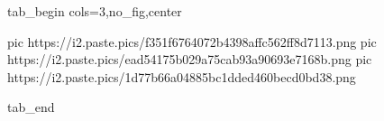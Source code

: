  
 
 
 
 


\ifcmt
  tab_begin cols=3,no_fig,center

     pic https://i2.paste.pics/f351f6764072b4398affc562ff8d7113.png
		 pic https://i2.paste.pics/ead54175b029a75cab93a90693e7168b.png
		 pic https://i2.paste.pics/1d77b66a04885bc1dded460becd0bd38.png

  tab_end
\fi
